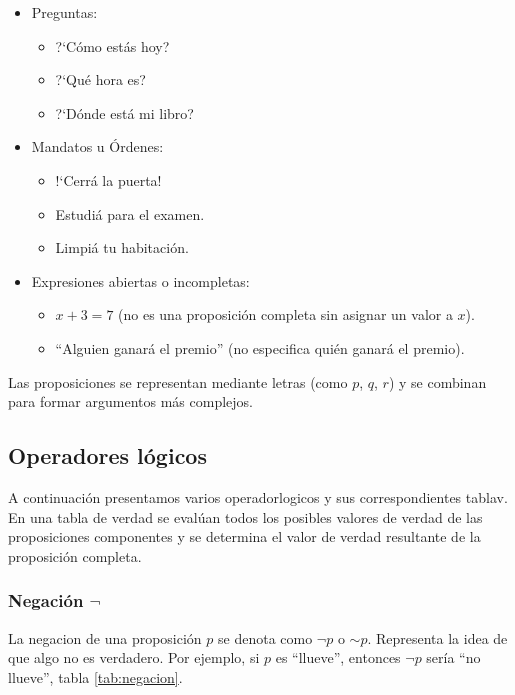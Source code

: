 \begin{fmd-example}
	\begin{itemize}
		\item Preguntas:
		\begin{itemize}
			\item ?`Cómo estás hoy?
			\item ?`Qué hora es?
			\item ?`Dónde está mi libro?
		\end{itemize}
		
		\item Mandatos u Órdenes:
		\begin{itemize}
			\item !`Cerrá la puerta!
			\item Estudiá para el examen.
			\item Limpiá tu habitación.
		\end{itemize}
		
		\item Expresiones abiertas o incompletas:
		\begin{itemize}
			\item $x + 3 = 7$ (no es una proposición completa sin asignar un valor a $x$).
			\item ``Alguien ganará el premio'' (no especifica quién ganará el premio).
		\end{itemize}
	\end{itemize}
\end{fmd-example}

Las proposiciones se representan mediante letras (como $p$, $q$, $r$) y se combinan para formar argumentos más complejos.

\subsection{Operadores lógicos} \label{sec:operadores_logicos}
A continuación presentamos varios \glspl{operadorlogico} y sus correspondientes \gls{tablav}. En una tabla de verdad se evalúan todos los posibles valores de verdad de las proposiciones componentes y se determina el valor de verdad resultante de la proposición completa. 

\subsubsection{Negación $\neg$} 
La \gls{negacion} de una proposición $p$ se denota como $\neg p$ o $\sim p$. Representa la idea de que algo no es verdadero. Por ejemplo, si $p$ es ``llueve'', entonces $\neg p$ sería ``no llueve'', tabla \ref{tab:negacion}.

